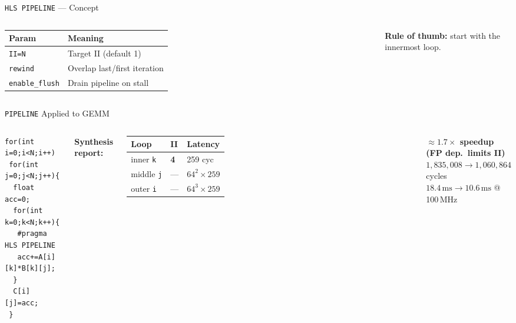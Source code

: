 \documentclass[aspectratio=169,12pt]{beamer}
\begin{document}
\begin{frame}{\texttt{HLS PIPELINE} --- Concept}
\begin{columns}[T,totalwidth=\textwidth]
  \vspace{8pt}
  \begin{tabular}{lp{4.5cm}}
    \hline
    \rowcolor{Navy!10}\textbf{Param} & \textbf{Meaning}\\
    \hline
    \texttt{II=N}          & Target II (default 1)\\
    \rowcolor{Navy!5}\texttt{rewind}  & Overlap last/first iteration\\
    \texttt{enable\_flush} & Drain pipeline on stall\\
    \hline
  \end{tabular}

  \vspace{10pt}
  {\small\color{Orange}\bfseries Rule of thumb:} {\small start with the innermost loop.}
\end{columns}
\end{frame}

\begin{frame}[fragile]{\texttt{PIPELINE} Applied to GEMM}
\vspace{0.1cm}
\begin{columns}[T,totalwidth=\textwidth]
\begin{lstlisting}
for(int i=0;i<N;i++)
 for(int j=0;j<N;j++){
  float acc=0;
  for(int k=0;k<N;k++){
   #pragma HLS PIPELINE
   acc+=A[i][k]*B[k][j];
  }
  C[i][j]=acc;
 }
\end{lstlisting}

  \vspace{0.1cm}
  {\small\color{Navy}\bfseries Synthesis report:}
  \vspace{4pt}

  \begin{tabular}{lll}
    \hline
    \rowcolor{Navy!10}\textbf{Loop} & \textbf{II} & \textbf{Latency}\\
    \hline
    inner \texttt{k}       & \textbf{\color{Orange}4} & 259 cyc\\
    \rowcolor{Navy!5}middle \texttt{j} & --- & $64^2\times259$\\
    outer \texttt{i}       & --- & $64^3\times259$\\
    \hline
  \end{tabular}

  \vspace{10pt}
  \colorbox{Teal!10}{\parbox{\dimexpr\linewidth-2\fboxsep\relax}{\vspace{4pt}
    {\color{Orange}\bfseries ${\approx}1.7\times$ speedup (FP dep.\ limits II)}\\
    {\small $1{,}835{,}008 \to 1{,}060{,}864$ cycles\\
    $18.4\,\text{ms} \to 10.6\,\text{ms}$ @ 100\,MHz}
  \vspace{4pt}}}
\end{columns}
\end{frame}
\end{document}
